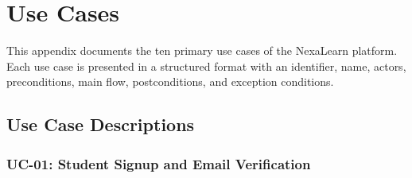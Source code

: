 
\chapter{Use Cases}
\label{app:usecases}

This appendix documents the ten primary use cases of the NexaLearn platform. Each use case is presented in a structured format with an identifier, name, actors, preconditions, main flow, postconditions, and exception conditions.

\section{Use Case Descriptions}

\subsection{UC-01: Student Signup and Email Verification}


